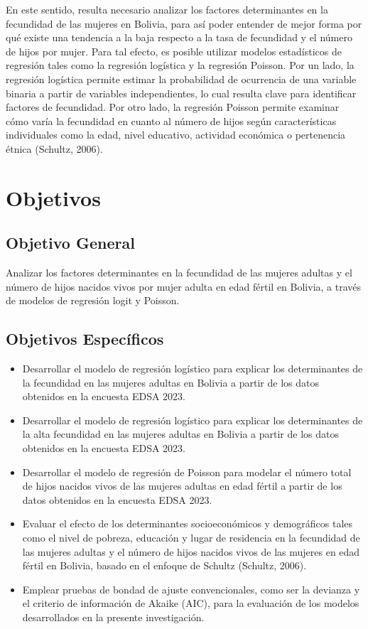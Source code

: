 \documentclass[Royal,times,sageh]{sagej}
\begin{document}
En este sentido, resulta necesario analizar los factores determinantes
en la fecundidad de las mujeres en Bolivia, para así poder entender de
mejor forma por qué existe una tendencia a la baja respecto a la tasa de
fecundidad y el número de hijos por mujer. Para tal efecto, es posible
utilizar modelos estadísticos de regresión tales como la regresión
logística y la regresión Poisson. Por un lado, la regresión logística
permite estimar la probabilidad de ocurrencia de una variable binaria a
partir de variables independientes, lo cual resulta clave para
identificar factores de fecundidad. Por otro lado, la regresión Poisson
permite examinar cómo varía la fecundidad en cuanto al número de hijos
según características individuales como la edad, nivel educativo,
actividad económica o pertenencia étnica (Schultz, 2006).

\section{Objetivos}\label{objetivos}

\subsection{Objetivo General}\label{objetivo-general}

Analizar los factores determinantes en la fecundidad de las mujeres
adultas y el número de hijos nacidos vivos por mujer adulta en edad
fértil en Bolivia, a través de modelos de regresión logit y Poisson.

\subsection{Objetivos Específicos}\label{objetivos-especuxedficos}

\begin{itemize}
\item
  Desarrollar el modelo de regresión logístico para explicar los
  determinantes de la fecundidad en las mujeres adultas en Bolivia a
  partir de los datos obtenidos en la encuesta EDSA 2023.
\item
  Desarrollar el modelo de regresión logístico para explicar los
  determinantes de la alta fecundidad en las mujeres adultas en Bolivia
  a partir de los datos obtenidos en la encuesta EDSA 2023.
\item
  Desarrollar el modelo de regresión de Poisson para modelar el número
  total de hijos nacidos vivos de las mujeres adultas en edad fértil a
  partir de los datos obtenidos en la encuesta EDSA 2023.
\item
  Evaluar el efecto de los determinantes socioeconómicos y demográficos
  tales como el nivel de pobreza, educación y lugar de residencia en la
  fecundidad de las mujeres adultas y el número de hijos nacidos vivos
  de las mujeres en edad fértil en Bolivia, basado en el enfoque de
  Schultz (Schultz, 2006).
\item
  Emplear pruebas de bondad de ajuste convencionales, como ser la
  devianza y el criterio de información de Akaike (AIC), para la
  evaluación de los modelos desarrollados en la presente investigación.
\end{itemize}
\end{document}
